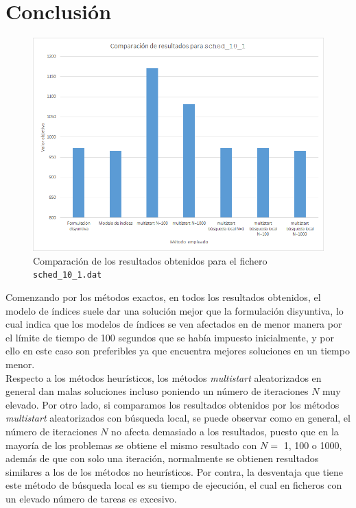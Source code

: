 \documentclass[a4paper,11pt]{article}
\begin{document}
\clearpage
\section{Conclusión}
\begin{figure}[!htbp]
	\centering
	\includegraphics[width=1.0\textwidth]{comparacion_sched_10_1.png}
    \caption{Comparación de los resultados obtenidos para el fichero \texttt{sched\_10\_1.dat}}
\end{figure}

Comenzando por los métodos exactos, en todos los resultados obtenidos, el modelo de índices suele dar una solución mejor que la formulación disyuntiva, lo cual indica que los modelos de índices se ven afectados en de menor manera por el límite de tiempo de 100 segundos que se había impuesto inicialmente, y por ello en este caso son preferibles ya que encuentra mejores soluciones en un tiempo menor.\\

Respecto a los métodos heurísticos, los métodos \textit{multistart} aleatorizados en general dan malas soluciones incluso poniendo un número de iteraciones $N$ muy elevado. Por otro lado, si comparamos los resultados obtenidos por los métodos \textit{multistart} aleatorizados con búsqueda local, se puede observar como en general, el número de iteraciones $N$ no afecta demasiado a los resultados, puesto que en la mayoría de los problemas se obtiene el mismo resultado con ${N=}$ 1, 100 o 1000, además de que con solo una iteración, normalmente se obtienen resultados similares a los de los métodos no heurísticos. Por contra, la desventaja que tiene este método de búsqueda local es su tiempo de ejecución, el cual en ficheros con un elevado número de tareas es excesivo.
\end{document}

